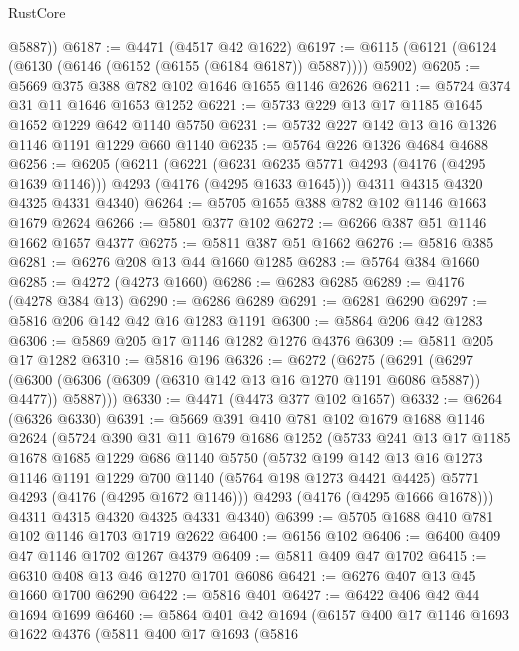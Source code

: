 \begin{lexlean}{RustCore}
\begin{coremodule}
        @5887))
@6187 := @4471 (@4517 @42 @1622)
@6197 := @6115 (@6121 (@6124 (@6130 (@6146 (@6152 (@6155 (@6184 @6187)) @5887)))) @5902)
@6205 := @5669 @375 @388 @782 @102 @1646 @1655 @1146 @2626
@6211 := @5724 @374 @31 @11 @1646 @1653 @1252
@6221 := @5733 @229 @13 @17 @1185 @1645 @1652 @1229 @642 @1140 @5750
@6231 := @5732 @227 @142 @13 @16 @1326 @1146 @1191 @1229 @660 @1140
@6235 := @5764 @226 @1326 @4684 @4688
@6256 := @6205
    (@6211
      (@6221
        (@6231 @6235 @5771 @4293 (@4176 (@4295 @1639 @1146)))
        @4293
        (@4176 (@4295 @1633 @1645)))
      @4311
      @4315
      @4320
      @4325
      @4331
      @4340)
@6264 := @5705 @1655 @388 @782 @102 @1146 @1663 @1679 @2624
@6266 := @5801 @377 @102
@6272 := @6266 @387 @51 @1146 @1662 @1657 @4377
@6275 := @5811 @387 @51 @1662
@6276 := @5816 @385
@6281 := @6276 @208 @13 @44 @1660 @1285
@6283 := @5764 @384 @1660
@6285 := @4272 (@4273 @1660)
@6286 := @6283 @6285
@6289 := @4176 (@4278 @384 @13)
@6290 := @6286 @6289
@6291 := @6281 @6290
@6297 := @5816 @206 @142 @42 @16 @1283 @1191
@6300 := @5864 @206 @42 @1283
@6306 := @5869 @205 @17 @1146 @1282 @1276 @4376
@6309 := @5811 @205 @17 @1282
@6310 := @5816 @196
@6326 := @6272
    (@6275
      (@6291
        (@6297 (@6300 (@6306 (@6309 (@6310 @142 @13 @16 @1270 @1191 @6086 @5887)) @4477)) @5887)))
@6330 := @4471 (@4473 @377 @102 @1657)
@6332 := @6264 (@6326 @6330)
@6391 := @5669
    @391
    @410
    @781
    @102
    @1679
    @1688
    @1146
    @2624
    (@5724
      @390
      @31
      @11
      @1679
      @1686
      @1252
      (@5733
        @241
        @13
        @17
        @1185
        @1678
        @1685
        @1229
        @686
        @1140
        @5750
        (@5732
          @199
          @142
          @13
          @16
          @1273
          @1146
          @1191
          @1229
          @700
          @1140
          (@5764 @198 @1273 @4421 @4425)
          @5771
          @4293
          (@4176 (@4295 @1672 @1146)))
        @4293
        (@4176 (@4295 @1666 @1678)))
      @4311
      @4315
      @4320
      @4325
      @4331
      @4340)
@6399 := @5705 @1688 @410 @781 @102 @1146 @1703 @1719 @2622
@6400 := @6156 @102
@6406 := @6400 @409 @47 @1146 @1702 @1267 @4379
@6409 := @5811 @409 @47 @1702
@6415 := @6310 @408 @13 @46 @1270 @1701 @6086
@6421 := @6276 @407 @13 @45 @1660 @1700 @6290
@6422 := @5816 @401
@6427 := @6422 @406 @42 @44 @1694 @1699
@6460 := @5864
    @401
    @42
    @1694
    (@6157
      @400
      @17
      @1146
      @1693
      @1622
      @4376
      (@5811
        @400
        @17
        @1693
        (@5816

\end{coremodule}
\end{lexlean}

